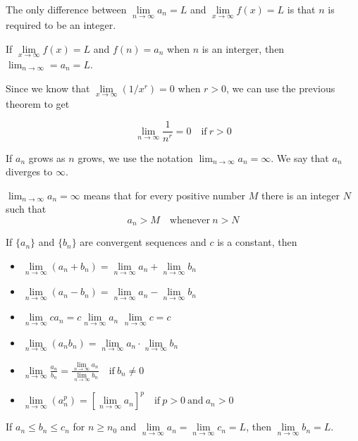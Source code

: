   The only difference between $\lim\limits_{n \to \infty} a_n = L$ and $\lim\limits_{x \to \infty} f(x) = L$ is that $n$ is required to be an integer.
  \begin{theorem}
    If $\lim\limits_{x \to \infty} f(x) = L$ and $f(n)=a_n$ when $n$ is an interger, then $\lim_{n \to \infty} = a_n = L$.
  \end{theorem}
  Since we know that $\lim\limits_{x \to \infty} (1/x^r)=0$ when $r>0$, we can use the previous theorem to get
  \begin{definition}
    $$\lim_{n \to \infty} \frac{1}{n^r}=0 \quad \text{if}\ r>0$$
  \end{definition}
  If $a_n$ grows as $n$ grows, we use the notation $\lim_{n \to \infty} a_n = \infty$. We say that $a_n$ diverges to $\infty$.
  \begin{definition}
    $\lim_{n \to \infty} a_n = \infty$ means that for every positive number $M$ there is an integer $N$ such that
    $$a_n>M \quad \text{whenever}\ n>N$$
  \end{definition}
  \begin{definition}
    If $\{a_n\}$ and $\{b_n\}$ are convergent sequences and $c$ is a constant, then
   \begin{itemize}
     \item[] $\lim\limits_{n \to \infty} (a_n + b_n) = \lim\limits_{n \to \infty} a_n + \lim\limits_{n \to \infty} b_n$
     \item[] $\lim\limits_{n \to \infty} (a_n - b_n) = \lim\limits_{n \to \infty} a_n - \lim\limits_{n \to \infty} b_n$
     \item[] $\lim\limits_{n \to \infty} ca_n = c\lim\limits_{n \to \infty} a_n$ \hspace{100pt} $\lim\limits_{n \to \infty} c = c$
     \item[] $\lim\limits_{n \to \infty} (a_n b_n) = \lim\limits_{n \to \infty} a_n \cdot \lim\limits_{n \to \infty} b_n$
     \item[] $\lim\limits_{n \to \infty} \frac{a_n}{b_n} = \frac{\lim\limits_{n \to \infty} a_n}{\lim\limits_{n \to \infty} b_n} \quad \text{if}\ b_n \neq 0$
     \item[] $\lim\limits_{n \to \infty} (a_{n}^{p}) = \left[\lim\limits_{n \to \infty} a_n\right]^p \quad \text{if}\ p > 0\ \text{and}\ a_n > 0$
   \end{itemize}
  \end{definition}
  \begin{theorem}
    If $a_n \leq b_n \leq c_n$ for $n \geq n_0$ and $\lim\limits_{n \to \infty} a_n = \lim\limits_{n \to \infty} c_n = L$, then $\lim\limits_{n \to \infty} b_n = L$.
  \end{theorem}
